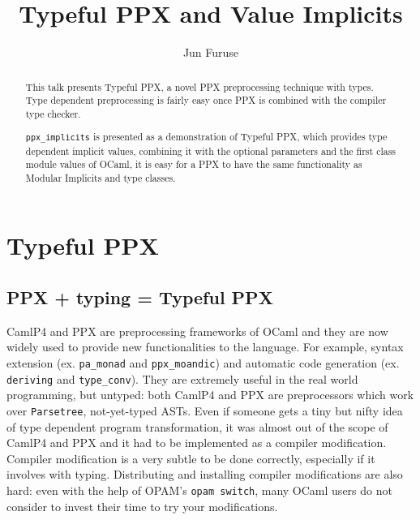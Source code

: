 \documentclass{article}
\begin{document}
\title{Typeful PPX and Value Implicits}
\date{}
\author{Jun Furuse}
\maketitle

\begin{abstract}\label{abstract}

This talk presents Typeful PPX, a novel PPX preprocessing technique with
types. Type dependent preprocessing is fairly easy once PPX is combined
with the compiler type checker.

\texttt{ppx\_implicits} is presented as a demonstration of Typeful PPX,
which provides type dependent implicit values, combining it with the
optional parameters and the first class module values of OCaml, it is
easy for a PPX to have the same functionality as Modular Implicits and
type classes.

\end{abstract}

\section{Typeful PPX}\label{typeful-ppx}

\subsection{PPX + typing = Typeful PPX}\label{ppx-typing-typeful-ppx}

CamlP4 and PPX are preprocessing frameworks of OCaml and they are now
widely used to provide new functionalities to the language. For example,
syntax extension (ex. \texttt{pa\_monad} and \texttt{ppx\_moandic}) and
automatic code generation (ex. \texttt{deriving} and
\texttt{type\_conv}).
They are extremely useful in the real world programming, but untyped:
both CamlP4 and PPX are preprocessors which work over
\texttt{Parsetree}, not-yet-typed ASTs. Even if someone gets a tiny but
nifty idea of type dependent program transformation, it was almost out
of the scope of CamlP4 and PPX and it had to be implemented as a
compiler modification. Compiler modification is a very subtle to be done
correctly, especially if it involves with typing. Distributing and
installing compiler modifications are also hard: even with the help of
OPAM's \texttt{opam switch}, many OCaml users do not consider to invest
their time to try your modifications.
\end{document}
